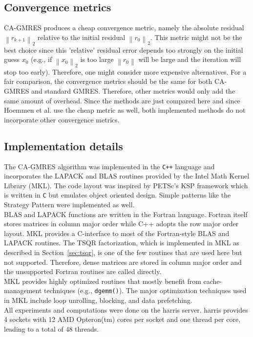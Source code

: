 \documentclass{scrartcl}
\numberwithin{equation}{section}
\newcommand{\norm}[1]{\left\lVert#1\right\rVert}
\begin{document}
\subsection{Convergence metrics}
CA-GMRES produces a cheap convergence metric, namely the absolute residual $\norm{r_{k+1}}_2$ relative to the initial residual $\norm{r_0}_2$. This metric might not be the best choice since this 'relative' residual error depends too strongly on the initial guess $x_0$ (e.g., if $\norm{x_0}_2$ is too large $\norm{r_0}$ will be large and the iteration will stop too early). Therefore, one might consider more expensive alternatives. For a fair comparison, the convergence metrics should be the same for both CA-GMRES and standard GMRES. Therefore, other metrics would only add the same amount of overhead. Since the methods are just compared here and since Hoemmen et al. use the cheap metric as well, both implemented methods do not incorporate other convergence metrics.

\subsection{Implementation details}\label{sec:implementation_details}
The CA-GMRES algorithm was implemented in the \texttt{C++} language and incorporates the LAPACK and BLAS routines provided by the Intel Math Kernel Library (MKL). The code layout was inspired by PETSc's KSP framework which is written in \texttt{C} but emulates object oriented design. Simple patterns like the Strategy Pattern were implemented as well.\\
BLAS and LAPACK functions are written in the Fortran language. Fortran itself stores matrices in column major order while C++ adopts the row major order layout. MKL provides a C-interface to most of the Fortran-style BLAS and LAPACK routines. The TSQR factorization, which is implemented in MKL as described in Section~\ref{sec:tsqr}, is one of the few routines that are used here but not supported. Therefore, dense matrices are stored in column major order and the unsupported Fortran routines are called directly.\\
MKL provides highly optimized routines that mostly benefit from cache-management techniques (e.g., \texttt{dgemm()}).
The major optimization techniques used in MKL include loop unrolling, blocking, and data prefetching.\\

All experiments and computations were done on the harris server. harris provides 4 sockets with 12 AMD Opteron(tm) cores per socket and one thread per core, leading to a total of 48 threads.
\end{document}
